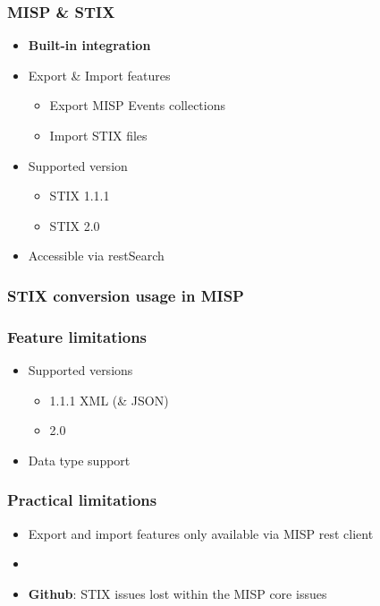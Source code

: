 
\begin{frame}[t,plain]
\titlepage
\end{frame}

\begin{frame}
    \frametitle{MISP \& STIX}
    \begin{itemize}
        \item{\bf Built-in integration}
        \item Export \& Import features
        \begin{itemize}
            \item Export MISP Events collections
            \item Import STIX files
        \end{itemize}
        \item Supported version
        \begin{itemize}
            \item STIX 1.1.1
            \item STIX 2.0
        \end{itemize}
        \item Accessible via restSearch
    \end{itemize}
\end{frame}

\begin{frame}
    \frametitle{STIX conversion usage in MISP}
\end{frame}

\begin{frame}
    \frametitle{Feature limitations}
    \begin{itemize}
        \item Supported versions
        \begin{itemize}
            \item 1.1.1 XML (\& JSON)
            \item 2.0
        \end{itemize}
        \item Data type support
    \end{itemize}
\end{frame}

\begin{frame}
    \frametitle{Practical limitations}
    \begin{itemize}
        \item Export and import features only available via MISP rest client
        \item []
        \item {\bf Github}: STIX issues lost within the MISP core issues
    \end{itemize}
\end{frame}

